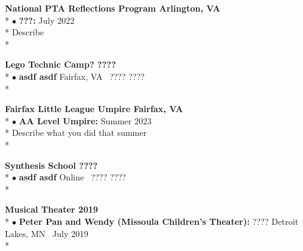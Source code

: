 \documentclass{article}
\begin{document}
\noindent \textbf{National PTA Reflections Program \hfill Arlington, VA} \\*
$\bullet$ \textbf{???:}  \hfill July 2022\\*
\indent \textendash Describe  \\*



\noindent \textbf{Lego Technic Camp? \hfill ????} \\*
$\bullet$ \textbf{asdf asdf} \hfill Fairfax, VA \textendash\  ???? ???? \\*

\noindent \textbf{Fairfax Little League Umpire \hfill Fairfax, VA} \\*
$\bullet$ \textbf{AA Level Umpire:}  \hfill Summer 2023\\*
\indent \textendash Describe what you did that summer \\*


\noindent \textbf{Synthesis School \hfill ????} \\*
$\bullet$ \textbf{asdf asdf} \hfill Online \textendash\  ???? ???? \\*


\noindent \textbf{Musical Theater \hfill 2019} \\*
$\bullet$ \textbf{Peter Pan and Wendy (Missoula Children's Theater):} ???? \hfill Detroit Lakes, MN \textendash\ July 2019 \\*


\end{document}
